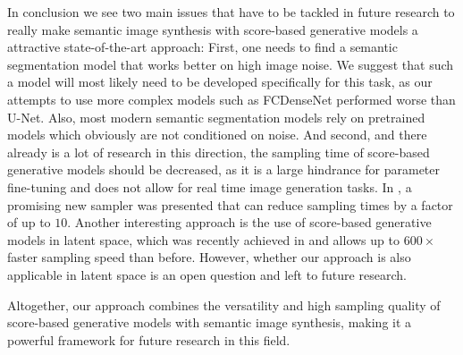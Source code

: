 In conclusion we see two main issues that have to be tackled in future research to really make semantic image synthesis with score-based generative models a attractive state-of-the-art approach: First, one needs to find a semantic segmentation model that works better on high image noise. We suggest that such a model will most likely need to be developed specifically for this task, as our attempts to use more complex models such as FCDenseNet \cite{densenet} performed worse than U-Net. Also, most modern semantic segmentation models rely on pretrained models which obviously are not conditioned on noise. And second, and there already is a lot of research in this direction, the sampling time of score-based generative models should be decreased, as it is a large hindrance for parameter fine-tuning and does not allow for real time image generation tasks. In \cite{gotta_go_fast}, a promising new sampler was presented that can reduce sampling times by a factor of up to $10$. Another interesting approach is the use of score-based generative models in latent space, which was recently achieved in \cite{latent} and allows up to $600\times$ faster sampling speed than before. However, whether our approach is also applicable in latent space is an open question and left to future research.

Altogether, our approach combines the versatility and high sampling quality of score-based generative models with semantic image synthesis, making it a powerful framework for future research in this field.


